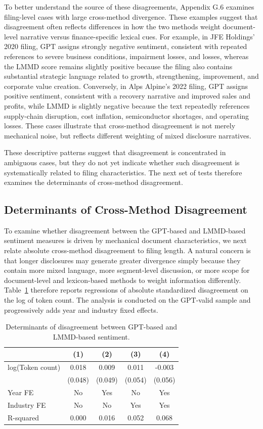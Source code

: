To better understand the source of these disagreements, Appendix G.6 examines filing-level cases with large cross-method divergence. These examples suggest that disagreement often reflects differences in how the two methods weight document-level narrative versus finance-specific lexical cues. For example, in JFE Holdings' 2020 filing, GPT assigns strongly negative sentiment, consistent with repeated references to severe business conditions, impairment losses, and losses, whereas the LMMD score remains slightly positive because the filing also contains substantial strategic language related to growth, strengthening, improvement, and corporate value creation. Conversely, in Alps Alpine's 2022 filing, GPT assigns positive sentiment, consistent with a recovery narrative and improved sales and profits, while LMMD is slightly negative because the text repeatedly references supply-chain disruption, cost inflation, semiconductor shortages, and operating losses. These cases illustrate that cross-method disagreement is not merely mechanical noise, but reflects different weighting of mixed disclosure narratives.

These descriptive patterns suggest that disagreement is concentrated in ambiguous cases, but they do not yet indicate whether such disagreement is systematically related to filing characteristics. The next set of tests therefore examines the determinants of cross-method disagreement.

\subsection{Determinants of Cross-Method Disagreement}
To examine whether disagreement between the GPT-based and LMMD-based sentiment measures is driven by mechanical document characteristics, we next relate absolute cross-method disagreement to filing length. A natural concern is that longer disclosures may generate greater divergence simply because they contain more mixed language, more segment-level discussion, or more scope for document-level and lexicon-based methods to weight information differently. Table~\ref{tab:disagreement_determinants} therefore reports regressions of absolute standardized disagreement on the log of token count. The analysis is conducted on the GPT-valid sample and progressively adds year and industry fixed effects.

\begin{table}[h]
\caption{Determinants of disagreement between GPT-based and LMMD-based sentiment.}
\label{tab:disagreement_determinants}
\begin{tabular}{lcccc}
\toprule
 & (1) & (2) & (3) & (4) \\
\midrule
log(Token count) & 0.018 & 0.009 & 0.011 & -0.003 \\
 & (0.048) & (0.049) & (0.054) & (0.056) \\
Year FE & No & Yes & No & Yes \\
Industry FE & No & No & Yes & Yes \\
R-squared & 0.000 & 0.016 & 0.052 & 0.068 \\
\bottomrule
\end{tabular}
\end{table}

